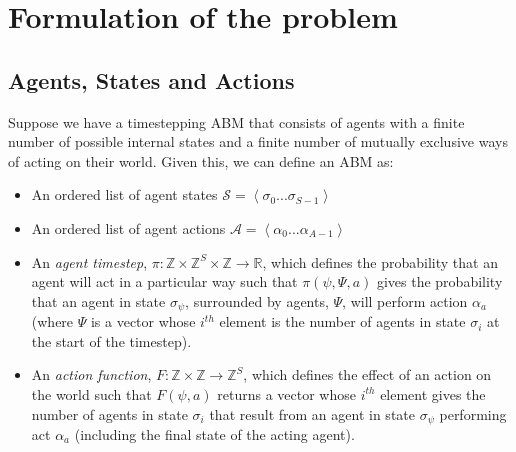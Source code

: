 \documentclass{article}
\begin{document}
\section{Formulation of the problem}

\subsection{Agents, States and Actions}
\label{abmdef}
Suppose we have a timestepping ABM that consists of agents with a finite number of possible internal states and a finite number of mutually exclusive ways of acting on their world. Given this, we can define an ABM as:
\begin{itemize}
	\item An ordered list of agent states $\mathcal{S} = \left<\sigma_0 ... \sigma_{S-1}\right>$

	\item An ordered list of agent actions $\mathcal{A} =\left< \alpha_0 ... \alpha_{A-1} \right>$	
	
	\item An \textit{agent timestep}, $\pi : \mathbb{Z}\times\mathbb{Z}^S\times\mathbb{Z} \to \mathbb{R}$, which defines the probability that an agent will act in a particular way such that $\pi(\psi,\Psi,a)$ gives the probability that an agent in state $\sigma_\psi$, surrounded by agents, $\Psi$, will perform action $\alpha_a$ (where $\Psi$ is a vector whose $i^{th}$ element is the number of agents in state $\sigma_i$ at the start of the timestep).
	
	\item An \textit{action function}, $F: \mathbb{Z} \times \mathbb{Z} \to \mathbb{Z}^S$, which defines the effect of an action on the world such that $F(\psi, a)$ returns a vector whose $i^{th}$ element gives the number of agents in state $\sigma_i$ that result from an agent in state $\sigma_\psi$ performing act $\alpha_a$ (including the final state of the acting agent).
\end{itemize}
\end{document}
